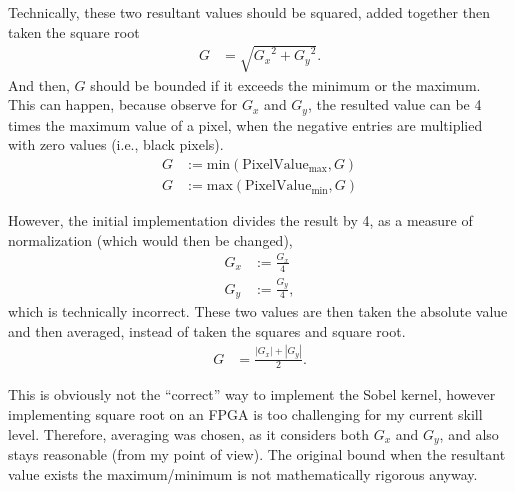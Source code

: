\documentclass{article}
\begin{document}
	 Technically, these two resultant values should be squared, added together then taken the square root
	\begin{align*}
		G&=\sqrt{{G_x}^2+{G_y}^2}.
	\end{align*}
	And then, $G$ should be bounded if it exceeds the minimum or the maximum. This can happen, because observe for $G_x$ and $G_y$, the resulted value can be 4 times the maximum value of a pixel, when the negative entries are multiplied with zero values (i.e., black pixels).
	\begin{align*}
		G&:=\text{min}(\text{PixelValue}_\text{max}, G)\\
		G&:=\text{max}(\text{PixelValue}_\text{min}, G)
	\end{align*}
	
	However, the initial implementation divides the result by 4, as a measure of normalization (which would then be changed),
	\begin{align*}
		G_x&:=\frac{G_x}{4}\\
		G_y&:=\frac{G_y}{4},
	\end{align*}
	which is technically incorrect. These two values are then taken the absolute value and then averaged, instead of taken the squares and square root.
	\begin{align*}
		G&=\frac{\left| G_x \right| +\left| G_y \right|}{2}.
	\end{align*}
	
	This is obviously not the ``correct'' way to implement the Sobel kernel, however implementing square root on an FPGA is too challenging for my current skill level. Therefore, averaging was chosen, as it considers both $G_x$ and $G_y$, and also stays reasonable (from my point of view). The original bound when the resultant value exists the maximum/minimum is not mathematically rigorous anyway.
	\\
	
\end{document}
